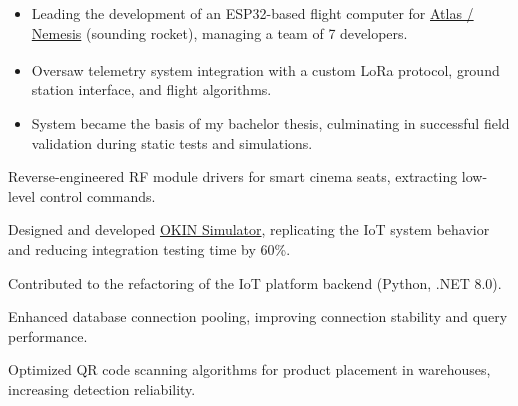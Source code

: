\documentclass[letterpaper,11pt,english]{article}
\begin{document}
{\begin{itemize}
    \item Leading the development of an ESP32-based flight computer for \href{https://github.com/AuroraRocketryTeam/atlas}{Atlas / Nemesis} (sounding rocket), managing a team of 7 developers.
    \item Oversaw telemetry system integration with a custom LoRa\textsuperscript{\textcopyright} protocol, ground station interface, and flight algorithms.
    \item System became the basis of my bachelor thesis, culminating in successful field validation during static tests and simulations.
  \end{itemize}}
\resumeItemListEnd
{}
\resumeItemListStart
  \item\small{Reverse-engineered RF module drivers for smart cinema seats, extracting low-level control commands.}
  \item\small{Designed and developed \href{https://github.com/aleemont1/OKINsimulator}{OKIN Simulator}, replicating the IoT system behavior and reducing integration testing time by 60\%.}
  \item\small{Contributed to the refactoring of the IoT platform backend (Python, .NET 8.0).}
\resumeItemListEnd


\newpage
{}
\resumeItemListStart
  \item\small{Enhanced database connection pooling, improving connection stability and query performance.}
  \item\small{Optimized QR code scanning algorithms for product placement in warehouses, increasing detection reliability.}
\resumeItemListEnd
\resumeSubHeadingListEnd

\end{document}

